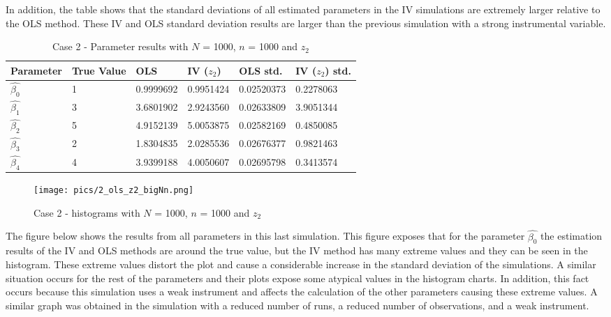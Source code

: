 \documentclass{article}
\begin{document}
In addition, the table shows that the standard deviations of all estimated parameters in the IV simulations are extremely larger relative to the OLS method. These IV and OLS standard deviation results are larger than the previous simulation with a strong instrumental variable.
\newline
\begin{table}[h!]
\centering
\begin{tabular}{ | m{2cm} | m{2cm}|  m{2cm}| m{2cm}|  m{2cm}| m{2cm}|} 
  \hline
  Parameter & True Value & OLS & IV ($z_{2}$) & OLS std. & IV ($z_{2}$) std.\\ 
  \hline
  $\hat{\beta_{0}}$ & 1 & 0.9999692 & 0.9951424 & 0.02520373 & 0.2278063\\ 
  \hline
  $\hat{\beta_{1}}$ & 3 & 3.6801902 & 2.9243560 & 0.02633809 & 3.9051344 \\
  \hline
  $\hat{\beta_{2}}$ & 5 & 4.9152139 & 5.0053875 & 0.02582169 & 0.4850085 \\
  \hline
  $\hat{\beta_{3}}$ & 2 & 1.8304835 & 2.0285536 & 0.02676377 & 0.9821463 \\
  \hline
  $\hat{\beta_{4}}$ & 4 & 3.9399188 & 4.0050607 & 0.02695798 & 0.3413574 \\
  \hline
\end{tabular}
\caption{Case 2 - Parameter results with $N$ = 1000, $n$ = 1000 and $z_{2}$}
\label{table:9}
\end{table} 
\newline
\begin{figure}[h]
\centering
\texttt{[image: pics/2\_ols\_z2\_bigNn.png]}
\caption{Case 2 - histograms with $N$ = 1000, $n$ = 1000 and $z_{2}$}
\label{fig:image2}
\end{figure}
\newline
The figure below shows the results from all parameters in this last simulation. This figure exposes that for the parameter $\hat{\beta_{0}}$ the estimation results of the IV and OLS methods are around the true value, but the IV method has many extreme values and they can be seen in the histogram.
These extreme values distort the plot and cause a considerable increase in the standard deviation of the simulations. A similar situation occurs for the rest of the parameters and their plots expose some atypical values in the histogram charts. In addition, this fact occurs because this simulation uses a weak instrument and affects the calculation of the other parameters causing these extreme values. A similar graph was obtained in the simulation with a reduced number of runs, a reduced number of observations, and a weak instrument.
\end{document}
